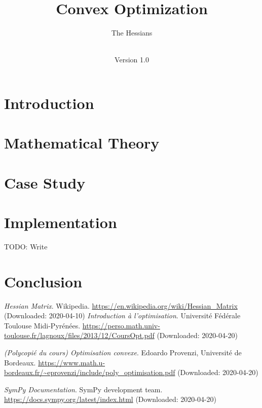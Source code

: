 \documentclass[notitlepage]{article}
\title{Convex Optimization\\}
\author{The Hessians}
\date{\documentdate\\Version 1.0} %
\begin{document}
\maketitle
\projectidentity
\authors

\newpage
\tableofcontents

\newpage
{}

\section{Introduction}

\newpage

\section{Mathematical Theory}

\newpage

\section{Case Study}

\newpage

\section{Implementation}
TODO: Write
\newpage

\section{Conclusion}

\newpage

\begin{thebibliography}{9}

	\textit{Hessian Matrix}.
	Wikipedia.
	\url{https://en.wikipedia.org/wiki/Hessian_Matrix} (Downloaded: 2020-04-10)
    \textit{Introduction à l'optimisation}.
    Université Fédérale Toulouse Midi-Pyrénées.
    \url{https://perso.math.univ-toulouse.fr/lagnoux/files/2013/12/CoursOpt.pdf} (Downloaded: 2020-04-20)

    \textit{(Polycopié du cours) Optimisation convexe}.
    Edoardo Provenzi, Université de Bordeaux.
    \url{https://www.math.u-bordeaux.fr/~eprovenzi/include/poly_optimisation.pdf} (Downloaded: 2020-04-20)

    \textit{SymPy Documentation}.
    SymPy development team.
    \url{https://docs.sympy.org/latest/index.html} (Downloaded: 2020-04-20)

\end{thebibliography}
\end{document}
